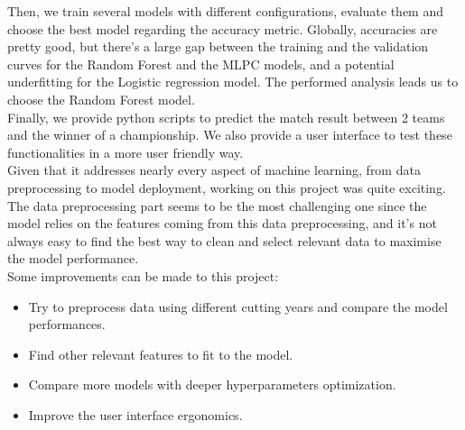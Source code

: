 \documentclass[a4paper,12pt]{article}
\begin{document}
Then, we train several models with different configurations, evaluate them and choose the best model regarding the accuracy metric. Globally, accuracies are pretty good, but there's a large gap between the training and the validation curves for the Random Forest and the MLPC models, and a potential underfitting for the Logistic regression model. The performed analysis leads us to choose the Random Forest model.\\

Finally, we provide python scripts to predict the match result between 2 teams and the winner of a championship. We also provide a user interface to test these functionalities in a more user friendly way.\\


Given that it addresses nearly every aspect of machine learning, from data preprocessing to model deployment, working on this project was quite exciting. \\

The data preprocessing part seems to be the most challenging one since the model relies on the features coming from this data preprocessing, and it's not always easy to find the best way to clean and select relevant data to maximise the model performance. \\

Some improvements can be made to this project:
\begin{itemize}
    \item Try to preprocess data using different cutting years and compare the model performances.
    \item Find other relevant features to fit to the model.
    \item Compare more models with deeper hyperparameters optimization.
    \item Improve the user interface ergonomics.
\end{itemize}
\end{document}
